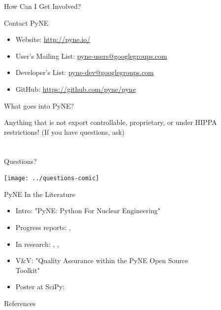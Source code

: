\documentclass[xcolor=x11names,compress]{beamer}
\renewcommand{\(}{\begin{columns}}
\renewcommand{\)}{\end{columns}}
\newcommand{\<}[1]{\begin{column}{#1}}
\renewcommand{\>}{\end{column}}
\begin{document}
\begin{frame}{How Can I Get Involved?}

    \textcolor{byellow}{Contact PyNE}
    \begin{itemize}
    \item Website: \href{http://pyne.io/}{http://pyne.io/}
    \item User's Mailing List: \href{pyne-users@googlegroups.com}{pyne-users@googlegroups.com}
    \item Developer's List: \href{pyne-dev@googlegroups.com}{pyne-dev@googlegroups.com}
    \item GitHub: \href{https://github.com/pyne/pyne}{https://github.com/pyne/pyne}
    \end{itemize}
    
    \vspace*{2 em}
    \textcolor{byellow}{What goes into PyNE?}

    Anything that is not export controllable, proprietary, 
    or under HIPPA restrictions!  (If you have questions, ask)
  
\end{frame}


\section*{}
\begin{frame}[fragile]{Questions?}

    \begin{center}
    \texttt{[image: ../questions-comic]}  
    \end{center}
  
\end{frame}

\begin{frame}[fragile]{PyNE In the Literature}

    \begin{itemize}
    \item Intro: "PyNE: Python For Nuclear Engineering" \cite{pyne_intro}
    \item Progress reports: \cite{scopatz_pyne}, \cite{pyne_progress}
    \item In research: \cite{Biondo2014}, \cite{MarquezDamian2014280}, \cite{Scopatz2013a}
    \item V\&V: "Quality Assurance within the PyNE Open Source \\Toolkit" \cite{pyne_vnv}
    \item Poster at SciPy: \cite{scipy}
    \end{itemize}
  
\end{frame}
\begin{frame}[allowframebreaks]{References}
	
	
\end{frame}
\end{document}
